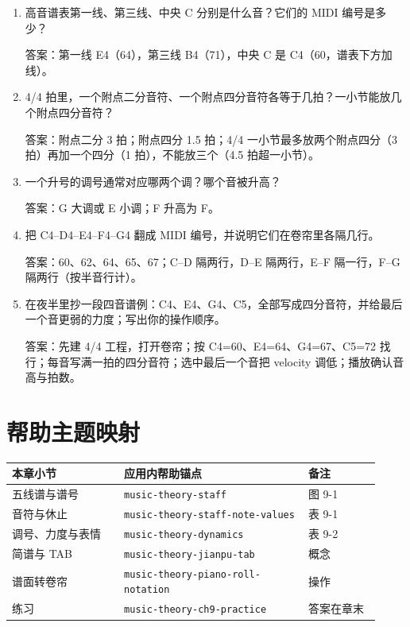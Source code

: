 \begin{exercise}
\begin{enumerate}
  \item 高音谱表第一线、第三线、中央 C 分别是什么音？它们的 MIDI 编号是多少？
  \par\noindent 答案：第一线 E4（64），第三线 B4（71），中央 C 是 C4（60，谱表下方加线）。
  \item 4/4 拍里，一个附点二分音符、一个附点四分音符各等于几拍？一小节能放几个附点四分音符？
  \par\noindent 答案：附点二分 3 拍；附点四分 1.5 拍；4/4 一小节最多放两个附点四分（3 拍）再加一个四分（1 拍），不能放三个（4.5 拍超一小节）。
  \item 一个升号的调号通常对应哪两个调？哪个音被升高？
  \par\noindent 答案：G 大调或 E 小调；F 升高为 F\sharpsym。
  \item 把 C4--D4--E4--F4--G4 翻成 MIDI 编号，并说明它们在卷帘里各隔几行。
  \par\noindent 答案：60、62、64、65、67；C--D 隔两行，D--E 隔两行，E--F 隔一行，F--G 隔两行（按半音行计）。
  \item 在夜半里抄一段四音谱例：C4、E4、G4、C5，全部写成四分音符，并给最后一个音更弱的力度；写出你的操作顺序。
  \par\noindent 答案：先建 4/4 工程，打开卷帘；按 C4=60、E4=64、G4=67、C5=72 找行；每音写满一拍的四分音符；选中最后一个音把 velocity 调低；播放确认音高与拍数。
\end{enumerate}
\end{exercise}

\section{帮助主题映射}

\begin{center}
\small
\begin{tabular}{p{0.28\linewidth}p{0.46\linewidth}p{0.18\linewidth}}
\toprule
本章小节 & 应用内帮助锚点 & 备注 \\
\midrule
五线谱与谱号 & \texttt{music-theory-staff} & 图 9-1 \\
音符与休止 & \texttt{music-theory-staff-note-values} & 表 9-1 \\
调号、力度与表情 & \texttt{music-theory-dynamics} & 表 9-2 \\
简谱与 TAB & \texttt{music-theory-jianpu-tab} & 概念 \\
谱面转卷帘 & \texttt{music-theory-piano-roll-notation} & 操作 \\
练习 & \texttt{music-theory-ch9-practice} & 答案在章末 \\
\bottomrule
\end{tabular}
\end{center}

